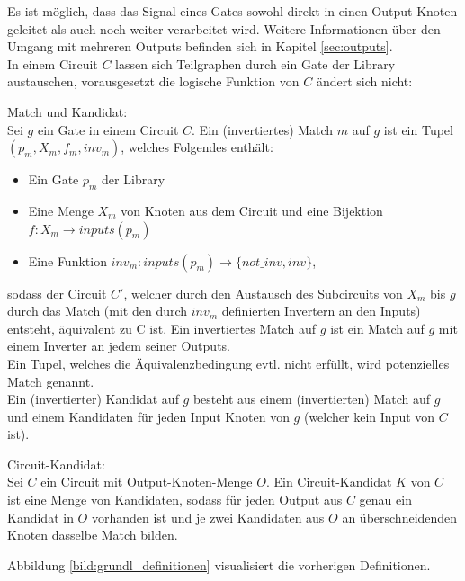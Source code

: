 \documentclass[11pt, a4paper, german]{article}
\begin{document}
Es ist möglich, dass das Signal eines Gates sowohl direkt in einen Output-Knoten geleitet als auch noch weiter verarbeitet wird. Weitere Informationen über den Umgang mit mehreren Outputs befinden sich in Kapitel \ref{sec:outputs}.\\
In einem Circuit $C$ lassen sich Teilgraphen durch ein Gate der Library austauschen, vorausgesetzt die logische Funktion von $C$ ändert sich nicht: 
\newpage
\begin{definition}{Match und Kandidat:}\\
Sei $g$ ein Gate in einem Circuit $C$. Ein (invertiertes) Match $m$ auf $g$ ist ein Tupel $(p_m, X_m, f_m, inv_m)$, welches Folgendes enthält:
\begin{itemize}
\item Ein Gate $p_m$ der Library
\item Eine Menge $X_m$ von Knoten aus dem Circuit und eine Bijektion $ f: X_m \rightarrow inputs(p_m)$
\item Eine Funktion $ inv_m : inputs(p_m) \rightarrow \{not\_inv , inv \}$,
\end{itemize}
sodass der Circuit $C'$, welcher durch den Austausch des Subcircuits von $X_m$ bis $g$ durch das Match (mit den durch $inv_m$ definierten Invertern an den Inputs) entsteht, äquivalent zu C ist.
Ein invertiertes Match auf $g$ ist ein Match auf $g$ mit einem Inverter an jedem seiner Outputs.\\
Ein Tupel, welches die Äquivalenzbedingung evtl. nicht erfüllt, wird potenzielles Match genannt.\\
Ein (invertierter) Kandidat auf $g$ besteht aus einem (invertierten) Match auf $g$ und einem Kandidaten für jeden Input Knoten von $g$ (welcher kein Input von $C$ ist).
\end{definition}
\begin{definition}{Circuit-Kandidat:}\\
Sei $C$ ein Circuit mit Output-Knoten-Menge $O$. Ein Circuit-Kandidat $K$ von $C$ ist eine Menge von Kandidaten, sodass für jeden Output aus $C$ genau ein Kandidat in $O$ vorhanden ist und je zwei Kandidaten aus $O$  an überschneidenden Knoten dasselbe Match bilden.
\end{definition}
Abbildung \ref{bild:grundl_definitionen} visualisiert die vorherigen Definitionen.\\
\end{document}
